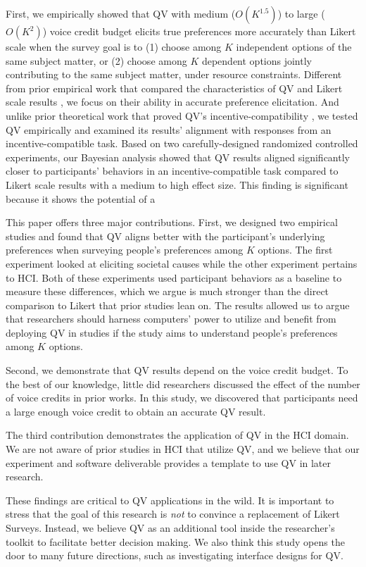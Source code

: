 First, we empirically showed that QV with medium ($O(K^{1.5})$) to large ($O(K^{2})$) voice credit budget elicits true preferences more accurately than Likert scale when the survey goal is to (1) choose among $K$ independent options of the same subject matter, or (2) choose among $K$ dependent options jointly contributing to the same subject matter, under resource constraints. Different from prior empirical work that compared the characteristics of QV and Likert scale results \cite{quarfoot2017quadratic, naylor2017first}, we focus on their ability in accurate preference elicitation. And unlike prior theoretical work that proved QV's incentive-compatibility \cite{lalley2018quadratic, posner2018radical}, we tested QV empirically and examined its results' alignment with responses from an incentive-compatible task. Based on two carefully-designed randomized controlled experiments, our Bayesian analysis showed that QV results aligned significantly closer to participants' behaviors in an incentive-compatible task compared to Likert scale results with a medium to high effect size. This finding is significant because it shows the potential of a 

This paper offers three major contributions.
First, we designed two empirical studies and found that QV aligns better with the participant's underlying preferences when surveying people's preferences among $K$ options. The first experiment looked at eliciting societal causes while the other experiment pertains to HCI. Both of these experiments used participant behaviors as a baseline to measure these differences, which we argue is much stronger than the direct comparison to Likert that prior studies lean on. The results allowed us to argue that researchers should harness computers' power to utilize and benefit from deploying QV in studies if the study aims to understand people's preferences among $K$ options.

Second, we demonstrate that QV results depend on the voice credit budget. To the best of our knowledge, little did researchers discussed the effect of the number of voice credits in prior works. In this study, we discovered that participants need a large enough voice credit to obtain an accurate QV result.

The third contribution demonstrates the application of QV in the HCI domain. We are not aware of prior studies in HCI that utilize QV, and we believe that our experiment and software deliverable provides a template to use QV in later research.

These findings are critical to QV applications in the wild. It is important to stress that the goal of this research is \textit{not} to convince a replacement of Likert Surveys. Instead, we believe QV as an additional tool inside the researcher's toolkit to facilitate better decision making. We also think this study opens the door to many future directions, such as investigating interface designs for QV.


